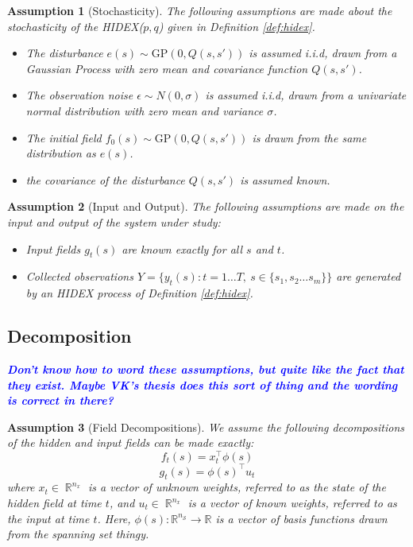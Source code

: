 \documentclass{IEEEtran}
\newcommand{\todo}[1]{\textsf{\emph{\textbf{\textcolor{blue}{#1}}}}}
\DeclareMathOperator{\R}{\mathbb{R}}
\DeclareMathOperator{\onto}{\rightarrow}
\newtheorem{assumption}{Assumption}
\begin{document}
\begin{assumption}[Stochasticity]
	\label{ass:noise}
	The following assumptions are made about the stochasticity of the HIDEX($p,q$) given in Definition \ref{def:hidex}.
	\begin{itemize}
		\item The disturbance $e(s) \sim \mathrm{GP}(0,Q(s,s'))$ is assumed i.i.d, drawn from a Gaussian Process with zero mean and covariance function $Q(s,s')$.
		\item The observation noise $\epsilon \sim N(0,\sigma)$ is assumed i.i.d, drawn from a univariate normal distribution with zero mean and variance $\sigma$.
		\item The initial field $f_0(s) \sim \mathrm{GP}(0,Q(s,s'))$ is drawn from the same distribution as $e(s)$.
		\item the covariance of the disturbance $Q(s,s')$ is assumed known.
	\end{itemize}
\end{assumption}

\begin{assumption}[Input and Output]
	\label{ass:inout}
The following assumptions are made on the input and output of the system under study:
	\begin{itemize}
		\item Input fields $g_t(s)$ are known exactly for all $s$ and $t$.
		\item Collected observations $Y = \{ y_t(s) : t = 1 \ldots T, ~ s \in \{s_1, s_2 \ldots s_m\} \}$ are generated by an HIDEX process of Definition \ref{def:hidex}.
	\end{itemize}
\end{assumption}

\subsection{Decomposition}
\label{sec:decomp}

\todo{Don't know how to word these assumptions, but quite like the fact that they exist. Maybe VK's thesis does this sort of thing and the wording is correct in there?}

\begin{assumption}[Field Decompositions]
	\label{ass:fielddecomp}
	We assume the following decompositions of the hidden and input fields can be made exactly:
\begin{equation}
	\label{eq:f decomp}
	f_t(s) = x_t^\top\phi(s)
\end{equation}
\begin{equation}
	g_t(s) = \phi(s)^\top u_t
\end{equation}	 
where $x_t \in \R^{n_x}$ is a vector of unknown weights, referred to as the state of the hidden field at time $t$, and $u_t \in \R^{n_x}$ is a vector of known weights, referred to as the input at time $t$. Here, $\phi(s) : \mathbb{R}^{n_\mathcal{S}} \onto \mathbb{R}$ is a vector of basis functions drawn from the spanning set thingy.
\end{assumption}
\end{document}
